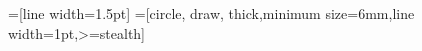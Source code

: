 \usepackage{algorithm}
\usepackage{algorithmic}

\usetikzlibrary{arrows,positioning} 
\usetikzlibrary{arrows,shapes,backgrounds,through,shadows}
\usetikzlibrary{decorations.pathmorphing}
\usetikzlibrary{calc}
=[line width=1.5pt]
=[circle, draw,%
thick,minimum size=6mm,line width=1pt,>=stealth]  %
